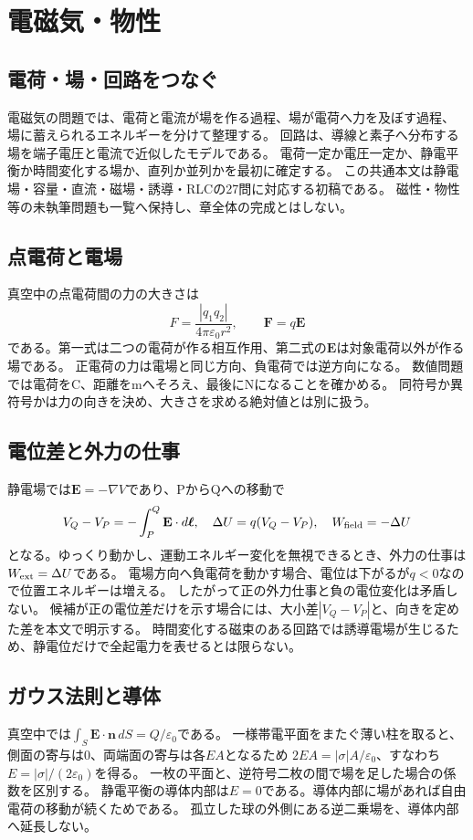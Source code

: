 \chapter{電磁気・物性}
\section{電荷・場・回路をつなぐ}
電磁気の問題では、電荷と電流が場を作る過程、場が電荷へ力を及ぼす過程、
場に蓄えられるエネルギーを分けて整理する。
回路は、導線と素子へ分布する場を端子電圧と電流で近似したモデルである。
電荷一定か電圧一定か、静電平衡か時間変化する場か、直列か並列かを最初に確定する。
この共通本文は静電場・容量・直流・磁場・誘導・RLCの27問に対応する初稿である。
磁性・物性等の未執筆問題も一覧へ保持し、章全体の完成とはしない。

\section{点電荷と電場}\label{theory:em:coulomb}
真空中の点電荷間の力の大きさは
\[
 F=\frac{|q_1q_2|}{4\pi\varepsilon_0r^2},\qquad \mathbf F=q\mathbf E
\]
である。第一式は二つの電荷が作る相互作用、第二式の$\mathbf E$は対象電荷以外が作る場である。
正電荷の力は電場と同じ方向、負電荷では逆方向になる。
数値問題では電荷をC、距離をmへそろえ、最後にNになることを確かめる。
同符号か異符号かは力の向きを決め、大きさを求める絶対値とは別に扱う。\autocite{mit_em02}

\section{電位差と外力の仕事}\label{theory:em:potential}
静電場では$\mathbf E=-\nabla V$であり、PからQへの移動で
\[
 V_Q-V_P=-\int_P^Q\mathbf E\cdot d\boldsymbol\ell,
 \quad \Delta U=q(V_Q-V_P),\quad W_{\rm field}=-\Delta U
\]
となる。ゆっくり動かし、運動エネルギー変化を無視できるとき、外力の仕事は$W_{\rm ext}=\Delta U$である。
電場方向へ負電荷を動かす場合、電位は下がるが$q<0$なので位置エネルギーは増える。
したがって正の外力仕事と負の電位変化は矛盾しない。
候補が正の電位差だけを示す場合には、大小差$|V_Q-V_P|$と、向きを定めた差を本文で明示する。
時間変化する磁束のある回路では誘導電場が生じるため、静電位だけで全起電力を表せるとは限らない。\autocite{mit_em03}

\section{ガウス法則と導体}\label{theory:em:gauss}
真空中では$\int_S\mathbf E\cdot\mathbf n\,dS=Q/\varepsilon_0$である。
一様帯電平面をまたぐ薄い柱を取ると、側面の寄与は0、両端面の寄与は各$EA$となるため
$2EA=|\sigma|A/\varepsilon_0$、すなわち$E=|\sigma|/(2\varepsilon_0)$を得る。
一枚の平面と、逆符号二枚の間で場を足した場合の係数を区別する。
静電平衡の導体内部は$E=0$である。導体内部に場があれば自由電荷の移動が続くためである。
孤立した球の外側にある逆二乗場を、導体内部へ延長しない。\autocite{mit_em04}

